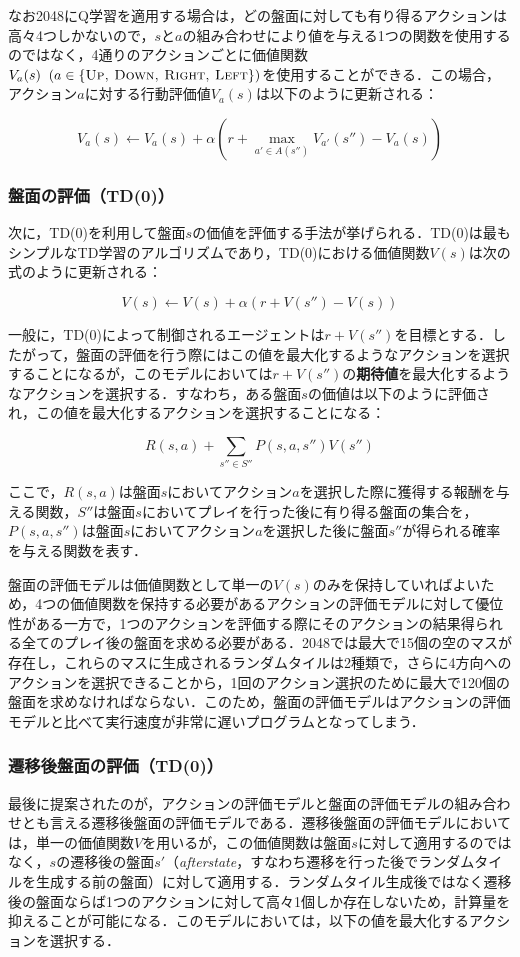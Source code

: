 \documentclass{suribt}
\begin{document}
なお2048にQ学習を適用する場合は，どの盤面に対しても有り得るアクションは高々4つしかないので，$s$と$a$の組み合わせにより値を与える1つの関数を使用するのではなく，4通りのアクションごとに価値関数$V_a(s) \;\; (a \in \text{\{\textsc{Up, Down, Right, Left}\}})$を使用することができる\cite{Szubert}．この場合，アクション$a$に対する行動評価値$V_a(s)$は以下のように更新される：

\[
	V_a(s) \leftarrow V_a(s) + {\alpha} (r + \max_{a' \in A(s'')} V_{a'}(s'') - V_a(s))
\]

\subsubsection{盤面の評価（TD(0)）}
次に，TD(0)を利用して盤面$s$の価値を評価する手法が挙げられる．TD(0)は最もシンプルなTD学習のアルゴリズムであり，TD(0)における価値関数$V(s)$は次の式のように更新される：

\[
	V(s) \leftarrow V(s) + \alpha (r + V(s'') - V(s) )
\]

一般に，TD(0)によって制御されるエージェントは$r+V(s'')$を目標とする\cite{Sutton}．したがって，盤面の評価を行う際にはこの値を最大化するようなアクションを選択することになるが，このモデルにおいては$r+V(s'')$の\textbf{期待値}を最大化するようなアクションを選択する．すなわち，ある盤面$s$の価値は以下のように評価され，この値を最大化するアクションを選択することになる：

\[
	R(s,a) + \sum_{s'' \in S''} P(s,a,s'')V(s'')
\]

ここで，$R(s,a)$は盤面$s$においてアクション$a$を選択した際に獲得する報酬を与える関数，$S''$は盤面$s$においてプレイを行った後に有り得る盤面の集合を，$P(s,a,s'')$は盤面$s$においてアクション$a$を選択した後に盤面$s''$が得られる確率を与える関数を表す．

盤面の評価モデルは価値関数として単一の$V(s)$のみを保持していればよいため，4つの価値関数を保持する必要があるアクションの評価モデルに対して優位性がある一方で，1つのアクションを評価する際にそのアクションの結果得られる全てのプレイ後の盤面を求める必要がある．2048では最大で15個の空のマスが存在し，これらのマスに生成されるランダムタイルは2種類で，さらに4方向へのアクションを選択できることから，1回のアクション選択のために最大で120個の盤面を求めなければならない．このため，盤面の評価モデルはアクションの評価モデルと比べて実行速度が非常に遅いプログラムとなってしまう．

\subsubsection{遷移後盤面の評価（TD(0)）}
最後に提案されたのが，アクションの評価モデルと盤面の評価モデルの組み合わせとも言える遷移後盤面の評価モデルである．遷移後盤面の評価モデルにおいては，単一の価値関数$V$を用いるが，この価値関数は盤面$s$に対して適用するのではなく，$s$の遷移後の盤面$s'$（\textit{afterstate}，すなわち遷移を行った後でランダムタイルを生成する前の盤面）に対して適用する．ランダムタイル生成後ではなく遷移後の盤面ならば1つのアクションに対して高々1個しか存在しないため，計算量を抑えることが可能になる．このモデルにおいては，以下の値を最大化するアクションを選択する．
\end{document}
